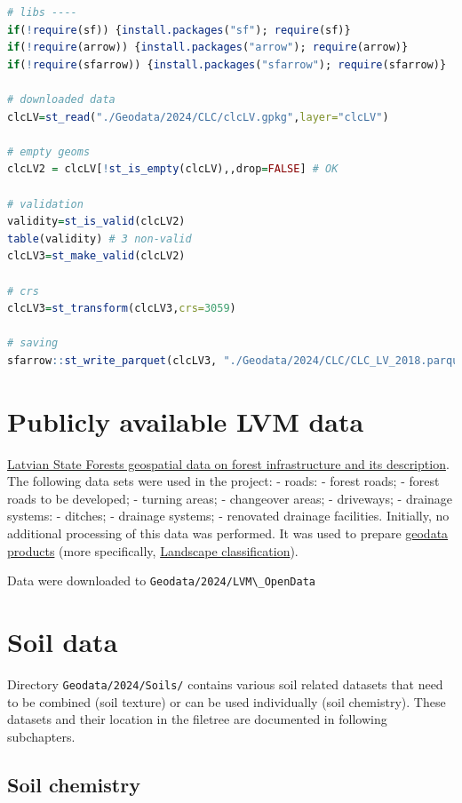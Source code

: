 \documentclass[
]{book}
\newcommand{\passthrough}[1]{#1}
\begin{document}
\begin{lstlisting}[language=R]
# libs ----
if(!require(sf)) {install.packages("sf"); require(sf)}
if(!require(arrow)) {install.packages("arrow"); require(arrow)}
if(!require(sfarrow)) {install.packages("sfarrow"); require(sfarrow)}

# downloaded data
clcLV=st_read("./Geodata/2024/CLC/clcLV.gpkg",layer="clcLV")

# empty geoms
clcLV2 = clcLV[!st_is_empty(clcLV),,drop=FALSE] # OK

# validation
validity=st_is_valid(clcLV2) 
table(validity) # 3 non-valid
clcLV3=st_make_valid(clcLV2)

# crs
clcLV3=st_transform(clcLV3,crs=3059)

# saving
sfarrow::st_write_parquet(clcLV3, "./Geodata/2024/CLC/CLC_LV_2018.parquet")
\end{lstlisting}

\section{Publicly available LVM data}\label{Ch04.06}

\href{https://data.gov.lv/dati/lv/dataset/as-latvijas-valsts-mezi-mezsaimniecibas-infrastruktura}{Latvian State Forests geospatial data on forest infrastructure and its description}. The
following data sets were used in the project:
- roads:
- forest roads;
- forest roads to be developed;
- turning areas;
- changeover areas;
- driveways;
- drainage systems:
- ditches;
- drainage systems;
- renovated drainage facilities.
Initially, no additional processing of this data was performed. It was used to
prepare \hyperref[Ch05]{geodata products} (more specifically, \hyperref[Ch05.03]{Landscape classification}).

Data were downloaded to \passthrough{\lstinline!Geodata/2024/LVM\_OpenData!}

\section{Soil data}\label{Ch04.07}

Directory \passthrough{\lstinline!Geodata/2024/Soils/!} contains various soil related datasets that need
to be combined (soil texture) or can be used individually (soil chemistry). These
datasets and their location in the filetree are documented in following subchapters.

\subsection{Soil chemistry}\label{Ch04.07.01}
\end{document}

